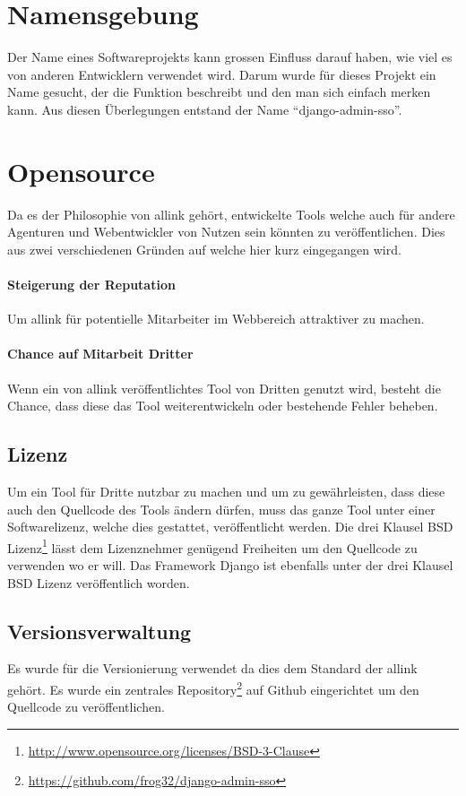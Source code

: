\section{Namensgebung}
\label{sec:namensgebung}
Der Name eines Softwareprojekts kann grossen Einfluss darauf haben, wie viel es von anderen Entwicklern verwendet wird. Darum wurde für dieses Projekt ein Name gesucht, der die Funktion beschreibt und den man sich einfach merken kann. Aus diesen Überlegungen entstand der Name ``django-admin-sso''.

\section{Opensource}
\label{sec:opensource}
Da es der Philosophie von allink gehört, entwickelte Tools welche auch für andere Agenturen und Webentwickler von Nutzen sein könnten zu veröffentlichen. Dies aus zwei verschiedenen Gründen auf welche hier kurz eingegangen wird.

\paragraph{Steigerung der Reputation}
\label{par:steigerung_der_reputation}
Um allink für potentielle Mitarbeiter im Webbereich attraktiver zu machen.
\paragraph{Chance auf Mitarbeit Dritter}
\label{par:chance_auf_mitarbeit_dritter}
Wenn ein von allink veröffentlichtes Tool von Dritten genutzt wird, besteht die Chance, dass diese das Tool weiterentwickeln oder bestehende Fehler beheben.

\subsection{Lizenz}
\label{sub:lizenz}
Um ein Tool für Dritte nutzbar zu machen und um zu gewährleisten, dass diese auch den Quellcode des Tools ändern dürfen, muss das ganze Tool unter einer Softwarelizenz, welche dies gestattet, veröffentlicht werden. Die drei Klausel BSD Lizenz\footnote{\url{http://www.opensource.org/licenses/BSD-3-Clause}} lässt dem Lizenznehmer genügend Freiheiten um den Quellcode zu verwenden wo er will. Das Framework Django ist ebenfalls unter der drei Klausel BSD Lizenz veröffentlich worden.

\subsection{Versionsverwaltung}
\label{sub:versionsverwaltung}
Es wurde  für die Versionierung verwendet da dies dem Standard der allink gehört. Es wurde ein zentrales Repository\footnote{\url{https://github.com/frog32/django-admin-sso}} auf Github eingerichtet um den Quellcode zu veröffentlichen.

